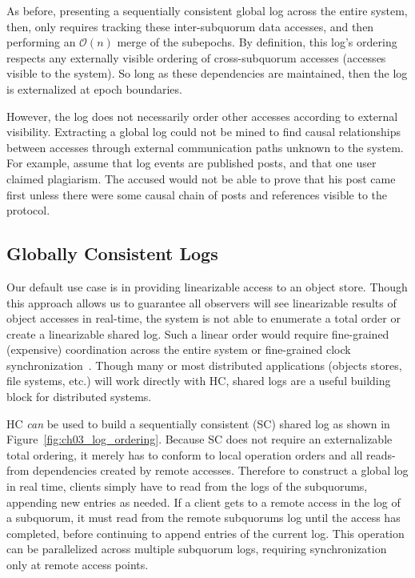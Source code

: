 As before, presenting a sequentially consistent global log across the entire system, then, only requires tracking these inter-subquorum data accesses, and then performing an $\mathcal{O}(n)$ merge of the subepochs.
By definition, this log's ordering respects any externally visible ordering of cross-subquorum accesses (accesses visible to the system).
So long as these dependencies are maintained, then the log is externalized at epoch boundaries.

However, the log does not necessarily order other accesses according to external visibility.
Extracting a global log could not be mined to find causal relationships between accesses through external communication paths unknown to the system.
For example, assume that log events are published posts, and that one user claimed plagiarism.
The accused would not be able to prove that his post came first unless there were some causal chain of posts and references visible to the protocol.

\subsection{Globally Consistent Logs}
\label{sec:ch03_log_ordering}

Our default use case is in providing linearizable access to an object store.
Though this approach allows us to guarantee all observers will see linearizable results of object accesses in real-time, the system is not able to enumerate a total order or create a linearizable shared log.
Such a linear order would require fine-grained (expensive) coordination across the entire system or fine-grained clock synchronization~\cite{spanner}.
Though many or most distributed applications (objects stores, file systems, etc.) will work directly with HC, shared logs are a useful building block for distributed systems.

HC \emph{can} be used to build a sequentially consistent (SC) shared log as shown in Figure~\ref{fig:ch03_log_ordering}.
Because SC does not require an externalizable total ordering, it merely has to conform to local operation orders and all reads-from dependencies created by remote accesses.
Therefore to construct a global log in real time, clients simply have to read from the logs of the subquorums, appending new entries as needed.
If a client gets to a remote access in the log of a subquorum, it must read from the remote subquorums log until the access has completed, before continuing to append entries of the current log.
This operation can be parallelized across multiple subquorum logs, requiring synchronization only at remote access points.

